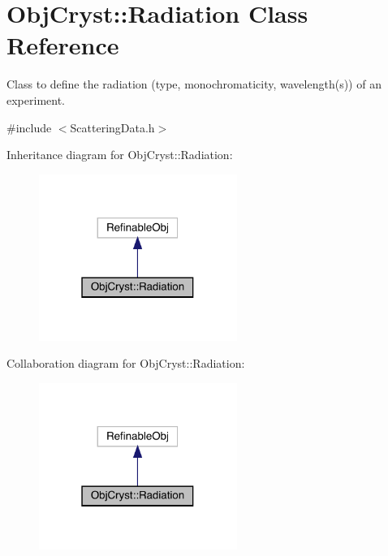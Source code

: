 \hypertarget{class_obj_cryst_1_1_radiation}{}\section{Obj\+Cryst\+::Radiation Class Reference}
\label{class_obj_cryst_1_1_radiation}


Class to define the radiation (type, monochromaticity, wavelength(s)) of an experiment.  




{\ttfamily \#include $<$Scattering\+Data.\+h$>$}



Inheritance diagram for Obj\+Cryst\+::Radiation\+:
\nopagebreak
\begin{figure}[H]
\begin{center}
\leavevmode
\includegraphics[width=183pt]{class_obj_cryst_1_1_radiation__inherit__graph}
\end{center}
\end{figure}


Collaboration diagram for Obj\+Cryst\+::Radiation\+:
\nopagebreak
\begin{figure}[H]
\begin{center}
\leavevmode
\includegraphics[width=183pt]{class_obj_cryst_1_1_radiation__coll__graph}
\end{center}
\end{figure}
